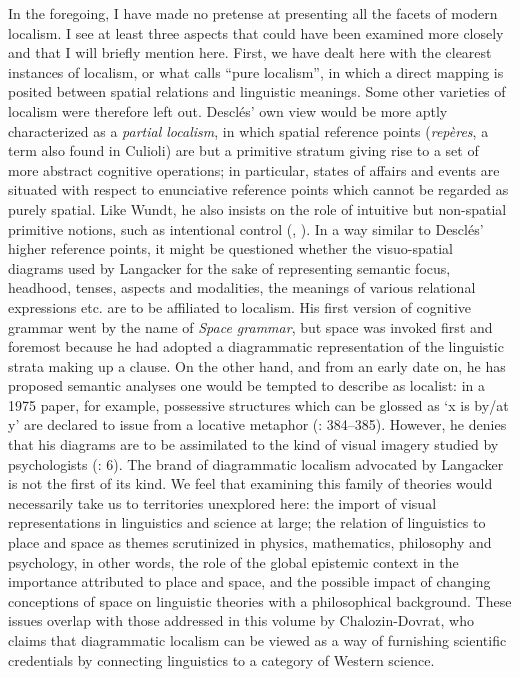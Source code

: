 \documentclass[output=paper]{langscibook}
\begin{document}
In the foregoing, I have made no pretense at presenting all the facets of modern localism. I see at least three aspects that could have been examined more closely and that I will briefly mention here. First, we have dealt here with the clearest instances of localism, or what \citet{descles_predication_1991} calls “pure localism”, in which a direct mapping is posited between spatial relations and linguistic meanings. Some other varieties of localism were therefore left out. Desclés’ own view would be more aptly characterized as a \textit{partial localism}, in which spatial reference points (\textit{repères}, a term also found in Culioli) are but a primitive stratum giving rise to a set of more abstract cognitive operations; in particular, states of affairs and events are situated with respect to enunciative reference points which cannot be regarded as purely spatial. Like Wundt, he also insists on the role of intuitive but non-spatial primitive notions, such as intentional control (\citeyear{descles_predication_1991}, \citeyear{descles_interactions_1993}). In a way similar to Desclés’ higher reference points, it might be questioned whether the visuo-spatial diagrams used by Langacker for the sake of representing semantic focus, headhood, tenses, aspects and modalities, the meanings of various relational expressions etc. are to be affiliated to localism. His first version of cognitive grammar went by the name of \textit{Space grammar}, but space was invoked first and foremost because he had adopted a diagrammatic representation of the linguistic strata making up a clause. On the other hand, and from an early date on, he has proposed semantic analyses one would be tempted to describe as localist: in a 1975 paper, for example, possessive structures which can be glossed as ‘x is by/at y’ are declared to issue from a locative metaphor (\citeyear{langacker_functional_1975}: 384--385). However, he denies that his diagrams are to be assimilated to the kind of visual imagery studied by psychologists (\citeyear{langacker_introduction_1986}: 6). The brand of diagrammatic localism advocated by Langacker is not the first of its kind. We feel that examining this family of theories would necessarily take us to territories unexplored here: the import of visual representations in linguistics and science at large; the relation of linguistics to place and space as themes scrutinized in physics, mathematics, philosophy and psychology, in other words, the role of the global epistemic context in the importance attributed to place and space, and the possible impact of changing conceptions of space on linguistic theories with a philosophical background. These issues overlap with those addressed in this volume by Chalozin-Dovrat, who claims that diagrammatic localism can be viewed as a way of furnishing scientific credentials by connecting linguistics to a category of Western science.
\end{document}
